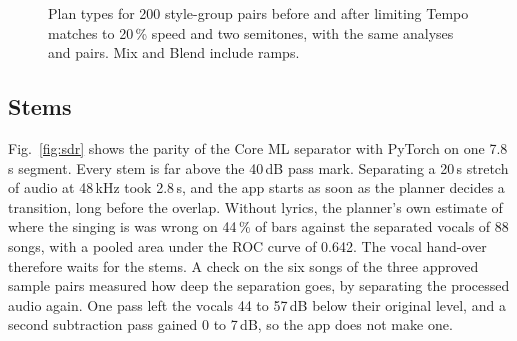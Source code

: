 \documentclass[conference,a4paper]{IEEEtran}
\begin{document}
\begin{figure}[t]
\centering
{}
\caption{Plan types for 200 style-group pairs before and after limiting Tempo matches to 20\,\%
speed and two semitones, with the same analyses and pairs. Mix and Blend include ramps.}
\label{fig:types}
\end{figure}

\subsection{Stems}
Fig.~\ref{fig:sdr} shows the parity of the Core ML separator with PyTorch on one 7.8\,s segment.
Every stem is far above the 40\,dB pass mark. Separating a 20\,s stretch of audio at 48\,kHz took
2.8\,s, and the app starts as soon as the planner decides a transition, long before the overlap.
Without lyrics, the planner's own estimate of where the singing is was wrong on 44\,\% of bars
against the separated vocals of 88 songs, with a pooled area under the ROC curve of 0.642. The vocal
hand-over therefore waits for the stems. A check on the six songs of the three approved sample pairs
measured how deep the separation goes, by separating the processed audio again. One pass left the
vocals 44 to 57\,dB below their original level, and a second subtraction pass gained 0 to 7\,dB, so
the app does not make one.
\end{document}
